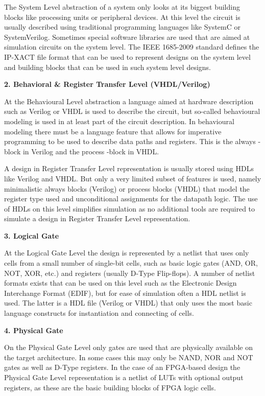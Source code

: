 \documentclass[
]{article}
\begin{document}
The System Level abstraction of a system only looks at its biggest
building blocks like processing units or peripheral devices. At this
level the circuit is usually described using traditional programming
languages like SystemC or SystemVerilog. Sometimes special software
libraries are used that are aimed at simulation circuits on the system
level. The IEEE 1685-2009 standard defines the IP-XACT file format that
can be used to represent designs on the system level and building blocks
that can be used in such system level designs.

\textbf{2. Behavioral \& Register Transfer Level (VHDL/Verilog)}

At the Behavioural Level abstraction a language aimed at hardware
description such as Verilog or VHDL is used to describe the circuit, but
so-called behavioural modeling is used in at least part of the circuit
description. In behavioural modeling there must be a language feature
that allows for imperative programming to be used to describe data paths
and registers. This is the always -block in Verilog and the process
-block in VHDL.

A design in Register Transfer Level representation is usually stored
using HDLs like Verilog and VHDL. But only a very limited subset of
features is used, namely minimalistic always blocks (Verilog) or process
blocks (VHDL) that model the register type used and unconditional
assignments for the datapath logic. The use of HDLs on this level
simplifies simulation as no additional tools are required to simulate a
design in Register Transfer Level representation.

\textbf{3. Logical Gate}

At the Logical Gate Level the design is represented by a netlist that
uses only cells from a small number of single-bit cells, such as basic
logic gates (AND, OR, NOT, XOR, etc.) and registers (usually D-Type
Flip-flops). A number of netlist formats exists that can be used on this
level such as the Electronic Design Interchange Format (EDIF), but for
ease of simulation often a HDL netlist is used. The latter is a HDL file
(Verilog or VHDL) that only uses the most basic language constructs for
instantiation and connecting of cells.

\textbf{4. Physical Gate}

On the Physical Gate Level only gates are used that are physically
available on the target architecture. In some cases this may only be
NAND, NOR and NOT gates as well as D-Type registers. In the case of an
FPGA-based design the Physical Gate Level representation is a netlist of
LUTs with optional output registers, as these are the basic building
blocks of FPGA logic cells.
\end{document}
